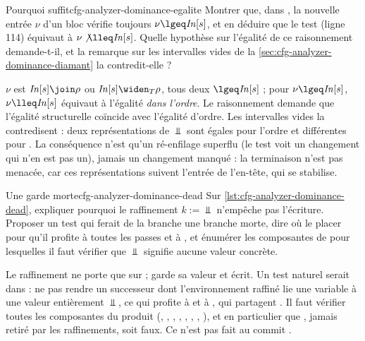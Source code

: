 \begin{exercice}{Pourquoi \code{!=} suffit}{cfg-analyzer-dominance-egalite}
  Montrer que, dans , la nouvelle entrée $\nu$ d'un bloc
  vérifie toujours $\nu \lgeq \mathit{In}[s]$, et en déduire que le test
  \code{!=} (ligne 114) équivaut à $\nu \not\lleq \mathit{In}[s]$. Quelle
  hypothèse sur l'égalité de  ce raisonnement demande-t-il,
  et la remarque sur les intervalles vides de la
  \cref{sec:cfg-analyzer-dominance-diamant} la contredit-elle ?
\end{exercice}
\begin{solution}
  $\nu$ est $\mathit{In}[s] \join \rho$ ou $\mathit{In}[s] \widen_T \rho$,
  tous deux $\lgeq \mathit{In}[s]$ ; pour $\nu \lgeq \mathit{In}[s]$,
  $\nu \lleq \mathit{In}[s]$ équivaut à l'égalité \emph{dans l'ordre}. Le
  raisonnement demande que l'égalité structurelle coïncide avec l'égalité
  d'ordre. Les intervalles vides la contredisent : deux représentations de
  $\Bot$ sont égales pour l'ordre et différentes pour \code{==}. La
  conséquence n'est qu'un ré-enfilage superflu (le test voit un changement
  qui n'en est pas un), jamais un changement manqué : la terminaison n'est
  pas menacée, car ces représentations suivent l'entrée de l'en-tête, qui se
  stabilise.
\end{solution}

\begin{exercice}{Une garde morte}{cfg-analyzer-dominance-dead}
  Sur \cref{lst:cfg-analyzer-dominance-dead}, expliquer pourquoi le
  raffinement $k := \Bot$ n'empêche pas l'écriture. Proposer un test qui
  ferait de la branche une branche morte, dire où le placer pour qu'il
  profite à toutes les passes et à , et énumérer les
  composantes de  pour lesquelles il faut vérifier que
  $\Bot$ signifie \og aucune valeur concrète\fg.
\end{exercice}
\begin{solution}
  Le raffinement ne porte que sur  ;  garde sa valeur et
   écrit. Un test naturel serait dans  :
  ne pas rendre un successeur dont l'environnement raffiné lie une variable
  à une valeur entièrement $\Bot$, ce qui profite à  et à
  , qui partagent . Il faut vérifier toutes
  les composantes du produit (, , ,
  , , , , ),
  et en particulier que , jamais retiré par les raffinements,
  soit faux. Ce n'est pas fait au commit \snapshotCommit{}.
\end{solution}
